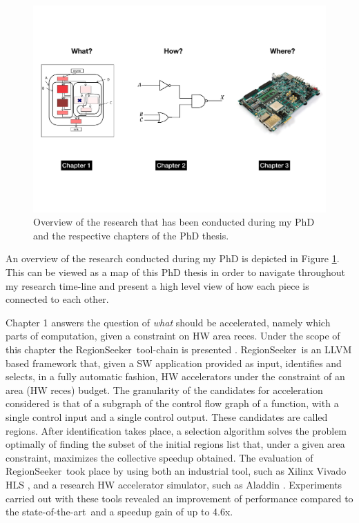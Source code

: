 \documentclass[]{usiinfthesis}
\newcommand{\rseeker}{{RegionSeeker}}
\newcommand{\SoTA}{{state-of-the-art}}
\begin{document}
\begin{figure}[t]
\centering
\includegraphics[width= 1 \linewidth]{figs/Research_Carol}
\caption{Overview of the research that has been conducted during my PhD and the respective chapters
of the PhD thesis.}
\label{fig:overview}
\end{figure}

An overview of the research conducted during my PhD is depicted in Figure \ref{fig:overview}.
This can be viewed as a map of this PhD thesis in order to navigate throughout my 
research time-line and present a high level view of how each piece is connected to each other.\par

Chapter 1 answers the question of {\em what} should be accelerated, namely which parts of 
computation, given a constraint on HW area reces. 
Under the scope of this chapter the \rseeker\ tool-chain is presented \cite{ZacharopoulosApr19}. 
\rseeker\ is an LLVM based framework 
that, given a SW application provided as input, identifies and selects, in a fully automatic fashion, HW 
accelerators under the constraint of an area (HW reces) budget. The granularity of the candidates for 
acceleration considered is that of a subgraph of the control flow graph of a function, with a single control 
input and a single control output. These candidates are called regions. After identification takes place, a selection algorithm solves the problem optimally of 
finding the subset of the initial regions list that, under a given area constraint, maximizes the collective 
speedup obtained. The evaluation of \rseeker\ took place by using both an industrial tool, such as Xilinx
Vivado HLS \cite{VivadoHLSMar17}, and a research HW accelerator simulator, such as Aladdin \cite{ShaoJul14}. 
Experiments carried out with these tools revealed an improvement of performance compared to the \SoTA\
and a speedup gain of up to 4.6x. 
\par
\end{document}
